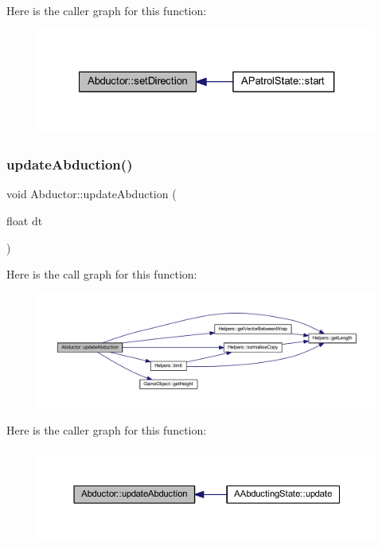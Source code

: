 Here is the caller graph for this function\+:
\nopagebreak
\begin{figure}[H]
\begin{center}
\leavevmode
\includegraphics[width=327pt]{class_abductor_aad7a615477ffe510984c8df16e98c903_icgraph}
\end{center}
\end{figure}
\mbox{\label{class_abductor_aa9e1628fe605674f599b1ff535c31ac1}} 
\subsubsection{\texorpdfstring{update\+Abduction()}{updateAbduction()}}
{\footnotesize\ttfamily void Abductor\+::update\+Abduction (\begin{DoxyParamCaption}\item[{float}]{dt }\end{DoxyParamCaption})}

Here is the call graph for this function\+:
\nopagebreak
\begin{figure}[H]
\begin{center}
\leavevmode
\includegraphics[width=350pt]{class_abductor_aa9e1628fe605674f599b1ff535c31ac1_cgraph}
\end{center}
\end{figure}
Here is the caller graph for this function\+:
\nopagebreak
\begin{figure}[H]
\begin{center}
\leavevmode
\includegraphics[width=350pt]{class_abductor_aa9e1628fe605674f599b1ff535c31ac1_icgraph}
\end{center}
\end{figure}
\mbox{\label{class_abductor_aab823ab3fd94214f90b003661e036d03}} 
